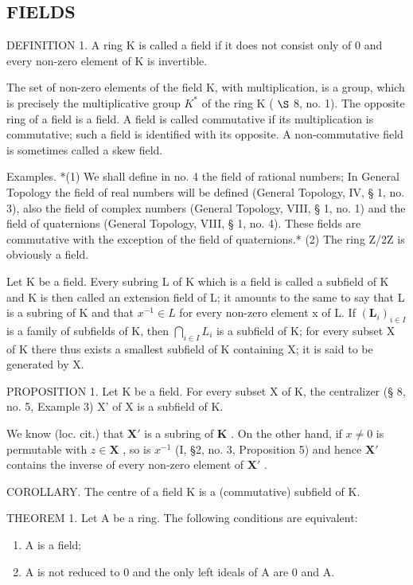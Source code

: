 \subsection{FIELDS}

DEFINITION 1. A ring K is called a field if it does not consist only of 0 and every non-zero element of K is invertible.

The set of non-zero elements of the field K, with multiplication, is a group, which is precisely the multiplicative group \(K^{*}\) of the ring K ( \(\S\) 8, no. 1). The opposite ring of a field is a field. A field is called commutative if its multiplication is commutative; such a field is identified with its opposite. A non-commutative field is sometimes called a skew field.

Examples. *(1) We shall define in no. 4 the field of rational numbers; In General Topology the field of real numbers will be defined (General Topology, IV, § 1, no. 3), also the field of complex numbers (General Topology, VIII, § 1, no. 1) and the field of quaternions (General Topology, VIII, § 1, no. 4). These fields are commutative with the exception of the field of quaternions.* (2) The ring Z/2Z is obviously a field.

Let K be a field. Every subring L of K which is a field is called a subfield of K and K is then called an extension field of L; it amounts to the same to say that L is a subring of K and that \(x^{-1} \in L\) for every non-zero element x of L. If \((\mathbf{L}_{i})_{i \in I}\) is a family of subfields of K, then \(\bigcap_{i \in I} L_{i}\) is a subfield of K; for every subset X of K there thus exists a smallest subfield of K containing X; it is said to be generated by X.

PROPOSITION 1. Let K be a field. For every subset X of K, the centralizer (§ 8, no. 5, Example 3) X' of X is a subfield of K.

We know (loc. cit.) that \(\mathbf{X}'\) is a subring of \(\mathbf{K}\) . On the other hand, if \(x \neq 0\) is permutable with \(z \in \mathbf{X}\) , so is \(x^{-1}\) (I, §2, no. 3, Proposition 5) and hence \(\mathbf{X}'\) contains the inverse of every non-zero element of \(\mathbf{X}'\) .

COROLLARY. The centre of a field K is a (commutative) subfield of K.

THEOREM 1. Let A be a ring. The following conditions are equivalent:

\begin{enumerate}
\def\labelenumi{(\alph{enumi})}
\item
  A is a field;
\item
  A is not reduced to 0 and the only left ideals of A are 0 and A.
\end{enumerate}


